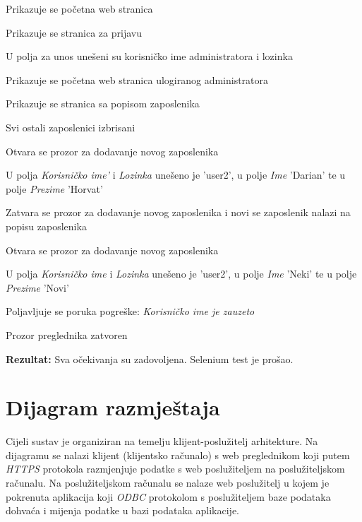 			\begin{packed_enum}
				
				\item Prikazuje se početna web stranica
				\item Prikazuje se stranica za prijavu
				\item U polja za unos unešeni su korisničko ime administratora i lozinka
				\item Prikazuje se početna web stranica ulogiranog administratora
				\item Prikazuje se stranica sa popisom zaposlenika
				\item Svi ostali zaposlenici izbrisani
				\item Otvara se prozor za dodavanje novog zaposlenika
				\item U polja \textit{Korisničko ime'} i \textit{Lozinka} unešeno je 'user2', u polje \textit{Ime} 'Darian' te u polje \textit{Prezime} 'Horvat'
				\item Zatvara se prozor za dodavanje novog zaposlenika i novi se zaposlenik nalazi na popisu zaposlenika
				\item Otvara se prozor za dodavanje novog zaposlenika
				\item U polja \textit{Korisničko ime} i \textit{Lozinka} unešeno je 'user2', u polje \textit{Ime} 'Neki' te u polje \textit{Prezime} 'Novi'
				\item Poljavljuje se poruka pogreške: \textit{Korisničko ime je zauzeto}
				\item Prozor preglednika zatvoren
				
			\end{packed_enum}
			
			\noindent\textbf{Rezultat:} Sva očekivanja su zadovoljena. Selenium test je prošao.
			
			
			
			\eject 
		
		
		\section{Dijagram razmještaja}
%			
%			
	
	
		Cijeli sustav je organiziran na temelju klijent-poslužitelj arhitekture. Na dijagramu se nalazi klijent (klijentsko računalo) s web preglednikom koji putem \textit{HTTPS} protokola razmjenjuje podatke s web poslužiteljem na poslužiteljskom računalu. Na poslužiteljskom računalu se nalaze web poslužitelj u kojem je pokrenuta aplikacija koji \textit{ODBC} protokolom s poslužiteljem baze podataka dohvaća i mijenja podatke u bazi podataka aplikacije.
		
